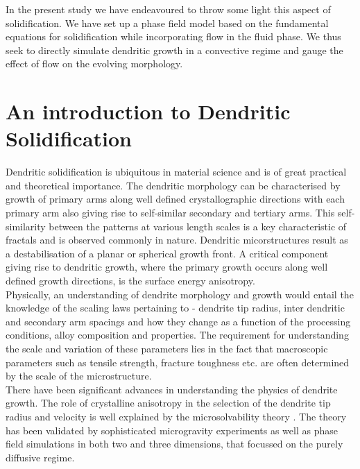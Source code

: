 \documentclass[a4paper]{report}
\begin{document}
In the present study we have endeavoured to throw some light this aspect of solidification. 
We have set up a phase field model based on the fundamental equations for solidification while 
incorporating flow in the fluid phase. We thus seek to directly simulate dendritic growth in 
a convective regime and gauge the effect of flow on the evolving morphology.\\

\chapter{An introduction to Dendritic Solidification}

Dendritic solidification is ubiquitous in material science and is of great practical and 
theoretical importance. The dendritic morphology can be characterised by growth of primary 
arms along well defined crystallographic directions with each primary arm also giving rise to 
self-similar secondary and tertiary arms. This self-similarity between the patterns at various 
length scales is a key characteristic of fractals and is observed commonly in
nature. Dendritic micorstructures result as a destabilisation of a planar or spherical growth 
front. A critical component giving rise to dendritic growth, where the primary growth occurs 
along well defined growth directions, is the surface energy anisotropy.\\

Physically, an understanding of dendrite morphology and growth would entail the knowledge of the 
scaling laws pertaining to -  dendrite tip radius, inter dendritic and secondary arm spacings 
and how they change as a function of the processing conditions, alloy composition and properties.
The requirement for understanding the scale and variation of these parameters lies in the fact 
that macroscopic parameters such as tensile strength, fracture toughness etc. are often 
determined by the scale of the microstructure.\\

There have been significant advances in understanding the physics of 
dendrite growth. The role of crystalline anisotropy in the selection of the dendrite 
tip radius and velocity is well explained by the microsolvability theory \cite{MS_theory}. The theory 
has been validated by sophisticated microgravity experiments as well as phase field 
simulations in both two and three dimensions, that focussed on the purely diffusive 
regime. 
\end{document}
